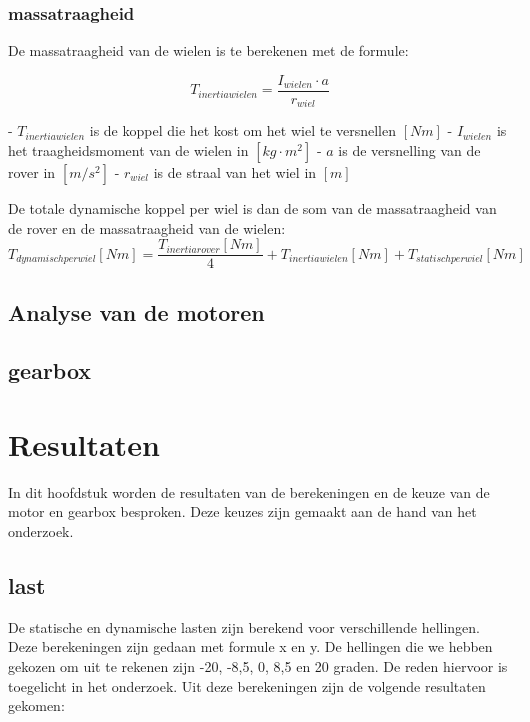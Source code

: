 \documentclass{article}
\begin{document}
        \subsubsection*{massatraagheid}

        De massatraagheid van de wielen is te berekenen met de formule:

        $$T_{inertiawielen} = \frac{I_{wielen} \cdot a}{r_{wiel}}$$
        
        - $T_{inertiawielen}$ is de koppel die het kost om het wiel te versnellen $[Nm]$ \newline
        - $I_{wielen}$ is het traagheidsmoment van de wielen in $[kg \cdot m^2]$ \newline
        - $a$ is de versnelling van de rover in $[m/s^2]$ \newline
        - $r_{wiel}$ is de straal van het wiel in $[m]$ \newline \newline

        De totale dynamische koppel per wiel is dan de som van de massatraagheid van de rover en de massatraagheid van de wielen:
        $$T_{dynamisch per wiel}[Nm] = \frac{T_{inertiarover}[Nm]}{4} + T_{inertiawielen}[Nm] + T_{statischperwiel}[Nm]$$ 


\subsection{Analyse van de motoren}
\subsection{gearbox}

\section{Resultaten}
    In dit hoofdstuk worden de resultaten van de berekeningen en de keuze van de motor en gearbox besproken.
    Deze keuzes zijn gemaakt aan de hand van het onderzoek.

    \subsection{last}
    De statische en dynamische lasten zijn berekend voor verschillende hellingen. 
    Deze berekeningen zijn gedaan met formule x en y.
    De hellingen die we hebben gekozen om uit te rekenen zijn -20, -8,5, 0, 8,5 en 20 graden.
    De reden hiervoor is toegelicht in het onderzoek.
    Uit deze berekeningen zijn de volgende resultaten gekomen: 
\end{document}
